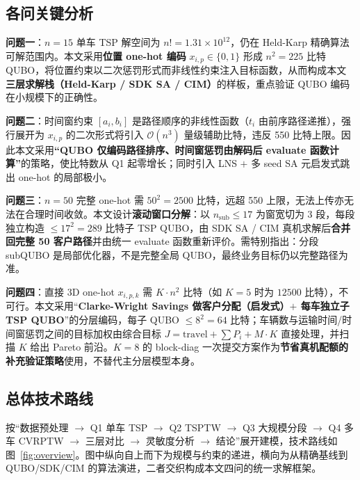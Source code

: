 \documentclass[UTF8,12pt,a4paper]{ctexart}
\begin{document}
\subsection{各问关键分析}

\textbf{问题一}：$n=15$ 单车 TSP 解空间为 $n!=1.31\!\times\!10^{12}$，仍在 Held-Karp 精确算法可解范围内。本文采用\textbf{位置 one-hot 编码} $x_{i,p}\!\in\!\{0,1\}$ 形成 $n^{2}=225$ 比特 QUBO，将位置约束以二次惩罚形式而非线性约束注入目标函数，从而构成本文\textbf{三层求解栈（Held-Karp / SDK SA / CIM）}的样板，重点验证 QUBO 编码在小规模下的正确性。

\textbf{问题二}：时间窗约束 $[a_i,b_i]$ 是路径顺序的非线性函数（$t_i$ 由前序路径递推），强行展开为 $x_{i,p}$ 的二次形式将引入 $\mathcal{O}(n^{3})$ 量级辅助比特，违反 550 比特上限。因此本文采用\textbf{``QUBO 仅编码路径排序、时间窗惩罚由解码后 evaluate 函数计算''}的策略，使比特数从 Q1 起零增长；同时引入 LNS $+$ 多 seed SA 元启发式跳出 one-hot 的局部极小。

\textbf{问题三}：$n=50$ 完整 one-hot 需 $50^{2}=2500$ 比特，远超 550 上限，无法上传亦无法在合理时间收敛。本文设计\textbf{滚动窗口分解}：以 $n_{\text{sub}}\!\le\!17$ 为窗宽切为 3 段，每段独立构造 $\le 17^{2}=289$ 比特子 TSP QUBO，由 SDK SA / CIM 真机求解后\textbf{合并回完整 50 客户路径}并由统一 evaluate 函数重新评价。需特别指出：分段 subQUBO 是局部优化器，不是完整全局 QUBO，最终业务目标仍以完整路径为准。

\textbf{问题四}：直接 3D one-hot $x_{i,p,k}$ 需 $K\!\cdot\!n^{2}$ 比特（如 $K\!=\!5$ 时为 $12500$ 比特），不可行。本文采用``\textbf{Clarke-Wright Savings 做客户分配（启发式）$+$ 每车独立子 TSP QUBO}''的分层编码，每子 QUBO $\le 8^{2}=64$ 比特；车辆数与运输时间/时间窗惩罚之间的目标加权由综合目标 $J=\text{travel}+\sum P_i+M\!\cdot\!K$ 直接处理，并扫描 $K$ 给出 Pareto 前沿。$K=8$ 的 block-diag 一次提交方案作为\textbf{节省真机配额的补充验证策略}使用，不替代主分层模型本身。

\subsection{总体技术路线}

按``数据预处理 $\rightarrow$ Q1 单车 TSP $\rightarrow$ Q2 TSPTW $\rightarrow$ Q3 大规模分段 $\rightarrow$ Q4 多车 CVRPTW $\rightarrow$ 三层对比 $\rightarrow$ 灵敏度分析 $\rightarrow$ 结论''展开建模，技术路线如图~\ref{fig:overview}。图中纵向自上而下为规模与约束的递进，横向为从精确基线到 QUBO/SDK/CIM 的算法演进，二者交织构成本文四问的统一求解框架。
\end{document}
